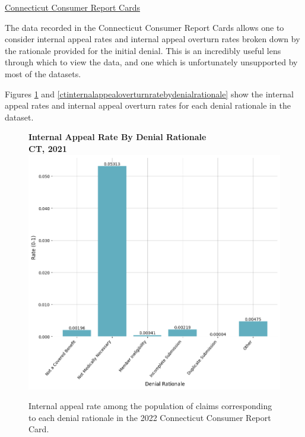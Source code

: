 \documentclass[12pt, a4paper,twoside,parskip=full]{report}
\theoremstyle{plain} %
\theoremstyle{definition} %
\theoremstyle{remark} %
\numberwithin{equation}{chapter}
\begin{document}
		\underline{Connecticut Consumer Report Cards}
		
		The data recorded in the Connecticut Consumer Report Cards allows one to consider internal appeal rates and internal appeal overturn rates broken down by the rationale provided for the initial denial. This is an incredibly useful lens through which to view the data, and one which is unfortunately unsupported by most of the datasets.
		
		Figures \ref{ctinternalappealratebydenialrationale} and \ref{ctinternalappealoverturnratebydenialrationale} show the internal appeal rates and internal appeal overturn rates for each denial rationale in the dataset.
		
		
			\begin{figure}[h!]
				\centering
				\textbf{Internal Appeal Rate By Denial Rationale}\\
				\textbf{CT, 2021}\\
				\includegraphics[width=\columnwidth]{images/ct_claims/internal_appeals_by_rationale.png}
				\caption{ Internal appeal rate among the population of claims corresponding to each denial rationale in the 2022 Connecticut Consumer Report Card.}
				\label{ctinternalappealratebydenialrationale}
			\end{figure}

	
	
\end{document}
